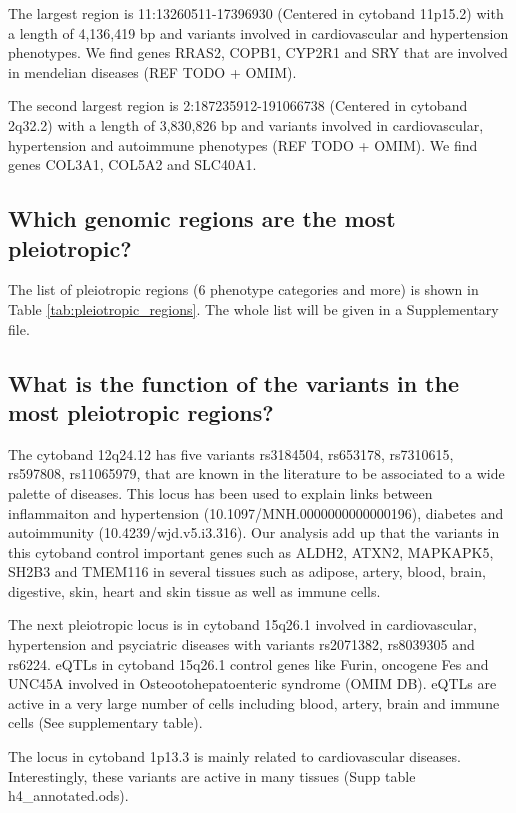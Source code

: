The largest region is 11:13260511-17396930 (Centered in cytoband 11p15.2) with a length of 4,136,419 bp and variants involved in cardiovascular and hypertension phenotypes.
We find genes RRAS2, COPB1, CYP2R1 and SRY that are involved in mendelian diseases (REF TODO + OMIM).

The second largest region is 2:187235912-191066738 (Centered in cytoband 2q32.2) with a length of 3,830,826 bp and variants involved in cardiovascular, hypertension and autoimmune phenotypes (REF TODO + OMIM).
We find genes COL3A1, COL5A2 and SLC40A1.

\subsection*{Which genomic regions are the most pleiotropic?}

The list of pleiotropic regions (6 phenotype categories and more) is shown in Table \ref{tab:pleiotropic_regions}. The whole list will be given in a Supplementary file.

\subsection*{What is the function of the variants in the most pleiotropic regions?}

The cytoband 12q24.12 has five variants rs3184504, rs653178, rs7310615, rs597808, rs11065979, that are known in the literature to be associated to a wide palette of diseases.
This locus has been used to explain links between inflammaiton and hypertension (10.1097/MNH.0000000000000196), diabetes and autoimmunity (10.4239/wjd.v5.i3.316).
%
Our analysis add up that the variants in this cytoband control important genes such as ALDH2, ATXN2, MAPKAPK5, SH2B3 and TMEM116 in several tissues such as adipose, artery, blood, brain, digestive, skin, heart and skin tissue as well as immune cells.




The next pleiotropic locus is in cytoband 15q26.1 involved in cardiovascular, hypertension and psyciatric diseases with variants rs2071382, rs8039305 and rs6224.
%
eQTLs in cytoband 15q26.1 control genes like Furin, oncogene Fes and UNC45A involved in Osteootohepatoenteric syndrome (OMIM DB).
%
eQTLs are active in a very large number of cells including blood, artery, brain and immune cells (See supplementary table).

The locus in cytoband 1p13.3 is mainly related to cardiovascular diseases.
Interestingly, these variants are active in many tissues (Supp table h4_annotated.ods).



